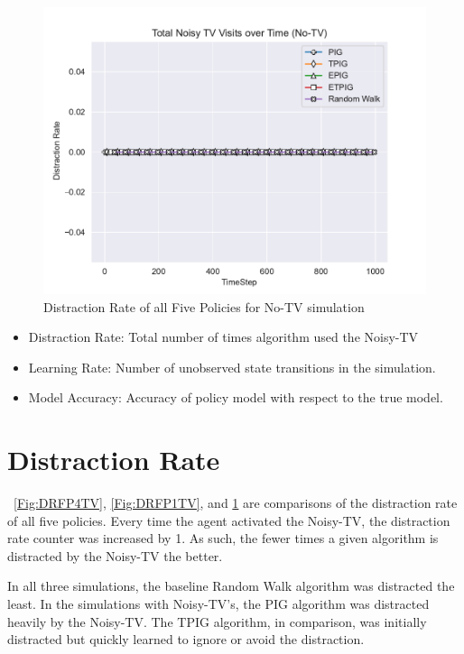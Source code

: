 \documentclass[12pt]{thesis}
\begin{document}
\begin{figure}
	\begin{center}
		\includegraphics[scale=0.8]{"images/Distraction_Rate_No-TV.pdf"}
	\end{center}
	\caption{Distraction Rate of all Five Policies for No-TV simulation}
	\label{Fig:DRFP0TV}
\end{figure}

\begin{itemize}[]
	\item Distraction Rate: Total number of times algorithm used the Noisy-TV
	\item Learning Rate: Number of unobserved state transitions in the simulation.
	\item Model Accuracy: Accuracy of policy model with respect to the true model.
\end{itemize}

\section{Distraction Rate}
\figurename~\ref{Fig:DRFP4TV}, \ref{Fig:DRFP1TV}, and \ref{Fig:DRFP0TV} are comparisons of the distraction rate of all five policies. Every time the agent activated the Noisy-TV, the distraction rate counter was increased by 1. As such, the fewer times a given algorithm is distracted by the Noisy-TV the better.

In all three simulations, the baseline Random Walk algorithm was distracted the least. In the simulations with Noisy-TV's, the PIG algorithm was distracted heavily by the Noisy-TV. The TPIG algorithm, in comparison, was initially distracted but quickly learned to ignore or avoid the distraction.
\end{document}
